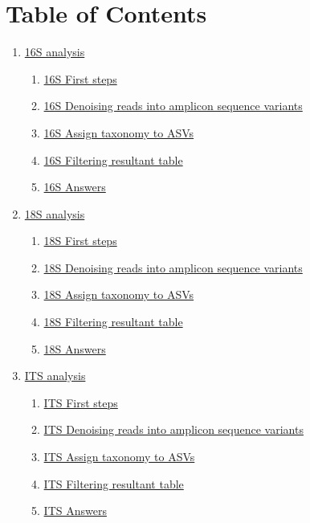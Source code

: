 \documentclass[
]{book}
\providecommand{\tightlist}{%
  \setlength{\itemsep}{0pt}\setlength{\parskip}{0pt}}
\begin{document}
\section{Table of Contents}\label{table-of-contents}

\begin{enumerate}
\def\labelenumi{\arabic{enumi}.}
\tightlist
\item
  \hyperref[1-16S]{16S analysis}

  \begin{enumerate}
  \def\labelenumii{\arabic{enumii}.}
  \tightlist
  \item
    \hyperref[11-16S-First-steps]{16S First steps}
  \item
    \hyperref[12-16S-denoising-the-reads-into-amplicon-sequence-variants]{16S Denoising reads into amplicon sequence variants}
  \item
    \hyperref[13-16S-assign-taxonomy-to-asvs]{16S Assign taxonomy to ASVs}
  \item
    \hyperref[14-16S-filtering-resultant-table]{16S Filtering resultant table}
  \item
    \hyperref[16S-Answers]{16S Answers}
  \end{enumerate}
\item
  \hyperref[2-18S]{18S analysis}

  \begin{enumerate}
  \def\labelenumii{\arabic{enumii}.}
  \tightlist
  \item
    \hyperref[21-18S-First-steps]{18S First steps}
  \item
    \hyperref[22-18S-denoising-the-reads-into-amplicon-sequence-variants]{18S Denoising reads into amplicon sequence variants}
  \item
    \hyperref[23-18S-assign-taxonomy-to-asvs]{18S Assign taxonomy to ASVs}
  \item
    \hyperref[24-18S-filtering-resultant-table]{18S Filtering resultant table}
  \item
    \hyperref[18S-Answers]{18S Answers}
  \end{enumerate}
\item
  \hyperref[3-ITS]{ITS analysis}

  \begin{enumerate}
  \def\labelenumii{\arabic{enumii}.}
  \tightlist
  \item
    \hyperref[31-ITS-First-steps]{ITS First steps}
  \item
    \hyperref[32-ITS-denoising-the-reads-into-amplicon-sequence-variants]{ITS Denoising reads into amplicon sequence variants}
  \item
    \hyperref[33-ITS-assign-taxonomy-to-asvs]{ITS Assign taxonomy to ASVs}
  \item
    \hyperref[34-ITS-filtering-resultant-table]{ITS Filtering resultant table}
  \item
    \hyperref[ITS-Answers]{ITS Answers}
  \end{enumerate}
\end{enumerate}
\end{document}
